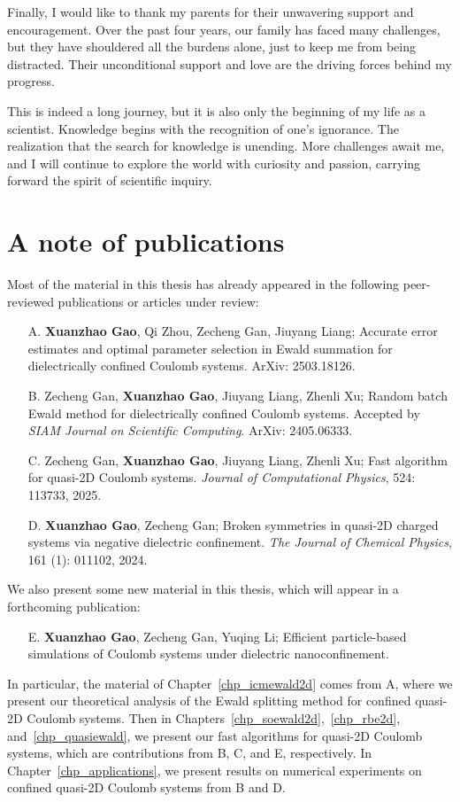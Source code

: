 Finally, I would like to thank my parents for their unwavering support and encouragement.
Over the past four years, our family has faced many challenges, but they have shouldered all the burdens alone, just to keep me from being distracted.
Their unconditional support and love are the driving forces behind my progress.

This is indeed a long journey, but it is also only the beginning of my life as a scientist.
Knowledge begins with the recognition of one's ignorance. 
The realization that the search for knowledge is unending.
More challenges await me, and I will continue to explore the world with curiosity and passion, carrying forward the spirit of scientific inquiry.


\section*{A note of publications}

Most of the material in this thesis has already appeared in the following peer-reviewed publications or articles under review:
\begin{itemize}
    \item[A.] \textbf{Xuanzhao Gao}, Qi Zhou, Zecheng Gan, Jiuyang Liang; Accurate error estimates and optimal parameter selection in Ewald summation for dielectrically confined Coulomb systems. ArXiv: 2503.18126.
    \item[B.] Zecheng Gan, \textbf{Xuanzhao Gao}, Jiuyang Liang, Zhenli Xu; Random batch Ewald method for dielectrically confined Coulomb systems. Accepted by \emph{SIAM Journal on Scientific Computing}. ArXiv: 2405.06333.
    \item[C.] Zecheng Gan, \textbf{Xuanzhao Gao}, Jiuyang Liang, Zhenli Xu; Fast algorithm for quasi-2D Coulomb systems. \emph{Journal of Computational Physics}, 524: 113733, 2025.
    \item[D.] \textbf{Xuanzhao Gao}, Zecheng Gan; Broken symmetries in quasi-2D charged systems via negative dielectric confinement. \emph{The Journal of Chemical Physics}, 161 (1): 011102, 2024.
\end{itemize}
We also present some new material in this thesis, which will appear in a forthcoming publication:
\begin{itemize}
    \item[E.] \textbf{Xuanzhao Gao}, Zecheng Gan, Yuqing Li; Efficient particle-based simulations of Coulomb systems under dielectric nanoconfinement.
\end{itemize}
In particular, the material of Chapter~\ref{chp_icmewald2d} comes from A, where we present our theoretical analysis of the Ewald splitting method for confined quasi-2D Coulomb systems.
Then in Chapters~\ref{chp_soewald2d},~\ref{chp_rbe2d}, and~\ref{chp_quasiewald}, we present our fast algorithms for quasi-2D Coulomb systems, which are contributions from B, C, and E, respectively.
In Chapter~\ref{chp_applications}, we present results on numerical experiments on confined quasi-2D Coulomb systems from B and D.